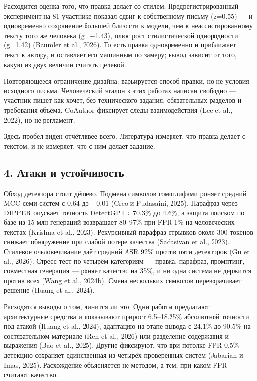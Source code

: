 \documentclass[11pt,a4paper]{article}
\renewcommand{\_}{\textunderscore\allowbreak}
\begin{document}
Расходится оценка того, что правка делает со стилем. Предрегистрированный
эксперимент на 81 участнике показал сдвиг к собственному письму (g=0.55) — и
одновременно сохранение большей близости к модели, чем к неассистированному
тексту того же человека (g=$-$1.43), плюс рост стилистической однородности
(g=1.42) (Baumler et al., 2026). То есть правка одновременно и приближает текст к автору, и
оставляет его машинным по замеру; вывод зависит от того, какую из двух величин
считать целевой.

Повторяющееся ограничение дизайна: варьируется способ правки, но не условия
исходного письма. Человеческий эталон в этих работах написан свободно — участник
пишет как хочет, без технического задания, обязательных разделов и требования
объёма. CoAuthor фиксирует следы взаимодействия (Lee et al., 2022), но не регламент.

Здесь пробел виден отчётливее всего. Литература измеряет, что правка делает с
текстом, и не измеряет, что с ним делает задание.

\subsection{4. Атаки и устойчивость}

Обход детектора стоит дёшево. Подмена символов гомоглифами роняет средний MCC
семи систем с 0.64 до $-$0.01 (Creo и Pudasaini, 2025). Парафраз через DIPPER опускает точность
DetectGPT с 70.3\% до 4.6\%, а защита поиском по базе из 15 млн генераций
возвращает 80–97\% при FPR 1\% на человеческих текстах (Krishna et al., 2023). Рекурсивный парафраз
отрывков около 300 токенов снижает обнаружение при слабой потере качества (Sadasivan et al., 2023).
Стилевое очеловечивание даёт средний ASR 92\% против пяти детекторов (Gu et al., 2026).
Стресс-тест по четырём категориям — правка, парафраз, промптинг, совместная
генерация — роняет качество на 35\%, и ни одна система не держится против всех
(Wang et al., 2024b). Смена нескольких символов переворачивает решение (Huang et al., 2024).

Расходятся выводы о том, чинится ли это. Одни работы предлагают архитектурные
средства и показывают прирост 6.5–18.25\% абсолютной точности под атакой (Huang et al., 2024),
адаптацию на этапе вывода с 24.1\% до 90.5\% на состязательном материале (Ren et al., 2026) или
разделение содержания и выражения (Bao et al., 2025). Другие фиксируют, что при потолке FPR
0.5\% детекцию сохраняет единственная из четырёх проверенных систем (Jabarian и Imas, 2025).
Расхождение объясняется не методом, а тем, при каком FPR считают качество.
\end{document}
